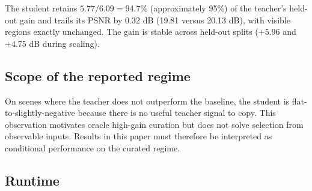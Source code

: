 \documentclass[10pt,twocolumn,letterpaper]{article}
\begin{document}
\begin{table}[t]
\centering\small
\caption{Distillation results (invisible-region PSNR) conditional on oracle
high-teacher-gain selection. The feed-forward student retains 94.7\% of the
teacher's held-out gain and leaves visible regions exactly unchanged.}
\end{table}
The student retains $5.77/6.09=94.7\%$ (approximately 95\%) of the teacher's
held-out gain and trails its PSNR by 0.32 dB (19.81 versus 20.13 dB), with visible
regions exactly unchanged. The gain is stable across held-out splits ($+5.96$
and $+4.75$ dB during scaling).

\subsection{Scope of the reported regime}
On scenes where the teacher does not outperform the baseline, the student is
flat-to-slightly-negative because there is no useful teacher signal to copy.
This observation motivates oracle high-gain curation but does not solve selection
from observable inputs. Results in this paper must therefore be interpreted as
conditional performance on the curated regime.

\subsection{Runtime}
\begin{table}[H]
\centering\small
\caption{Runtime and quality on the selected regime. The student is four
$3\times3$ convolutions applied once per frame; the teacher requires a 30-step
diffusion denoise of the clip.}
\end{table}
\end{document}
